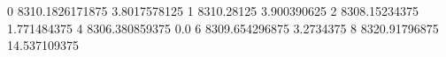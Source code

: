 0 8310.1826171875 3.8017578125
1 8310.28125 3.900390625
2 8308.15234375 1.771484375
4 8306.380859375 0.0
6 8309.654296875 3.2734375
8 8320.91796875 14.537109375

